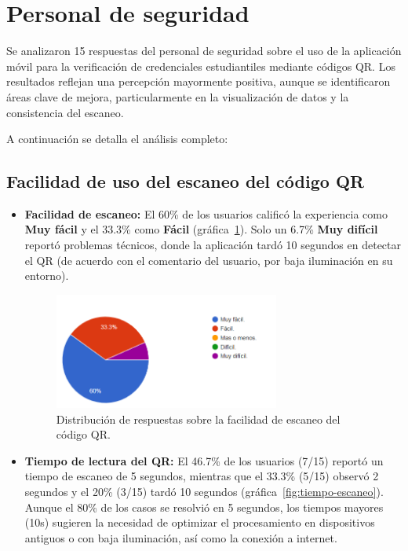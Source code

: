 \section{Personal de seguridad}
Se analizaron 15 respuestas del personal de seguridad sobre el uso de la aplicación móvil para la verificación de credenciales estudiantiles mediante códigos QR. Los resultados reflejan una percepción mayormente positiva, aunque se identificaron áreas clave de mejora, particularmente en la visualización de datos y la consistencia del escaneo.

A continuación se detalla el análisis completo:
\subsection{Facilidad de uso del escaneo del código QR}
\begin{itemize}
	\item \textbf{Facilidad de escaneo:} 
	El 60\% de los usuarios calificó la experiencia como \textbf{Muy fácil} y el 33.3\% como \textbf{Fácil} (gráfica~\ref{fig:facilidad-escaneo}). 
	Solo un 6.7\% \textbf{Muy difícil} reportó problemas técnicos, donde la aplicación tardó 10 segundos en detectar el QR (de acuerdo con el comentario del usuario, por baja iluminación en su entorno).
	
	\begin{figure}
		\centering
		\includegraphics[width=0.7\textwidth]{images/grafico_escaneo.png}
		\caption{Distribución de respuestas sobre la facilidad de escaneo del código QR.}
		\label{fig:facilidad-escaneo}
	\end{figure}
	
	\item \textbf{Tiempo de lectura del QR:}  
	El 46.7\% de los usuarios (7/15) reportó un tiempo de escaneo de 5 segundos, mientras que el 33.3\% (5/15) observó 2 segundos y el 20\% (3/15) tardó 10 segundos (gráfica~\ref{fig:tiempo-escaneo}).  
	Aunque el 80\% de los casos se resolvió en 5 segundos, los tiempos mayores (10s) sugieren la necesidad de optimizar el procesamiento en dispositivos antiguos o con baja iluminación, así como la conexión a internet.
	

\end{itemize}

